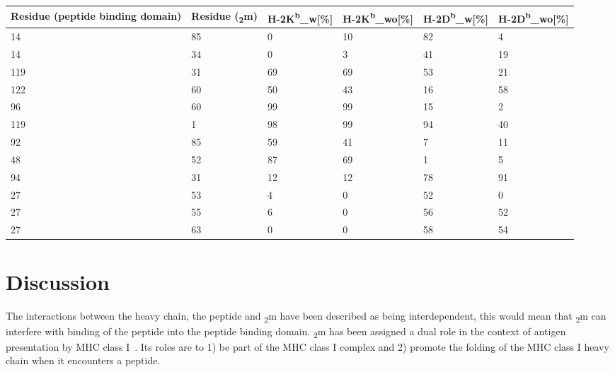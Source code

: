 \documentclass[11pt,twocolumn]{article}
\newcommand{\db}{H-2D\textsuperscript{b}\xspace}
\newcommand{\dbw}{H-2D\textsuperscript{b}\_w\xspace}
\newcommand{\dbwo}{H-2D\textsuperscript{b}\_wo\xspace}
\newcommand{\kb}{H-2K\textsuperscript{b}\xspace}
\newcommand{\kbw}{H-2K\textsuperscript{b}\_w\xspace}
\newcommand{\kbwo}{H-2K\textsuperscript{b}\_wo\xspace}
\newcommand{\angstr}{{\AA}ngstroms\xspace}
\newcommand{\btm}{\textbeta\textsubscript{2}m\xspace}
\begin{document}
\begin{table*}
\caption{\textbf{ Compilation of the the interacting residues used for the
	analysis of \kb and \db, and the percentage of interactions bellow
below four \angstr, of each analysed condition.} The residues interacting
coming from the peptide binding domain, the residues interacting coming from
\btm and the percentage of their interaction which is below four \angstr is
analysed in \db and \kb for the condition of with peptide and without peptide}
\label{KBDBinteractions}
\begin{tabularx}{\linewidth}{|X|X|X|X|X|X|}  \hline
Residue (peptide binding domain)&Residue (\btm)&\kbw [\%]&\kbwo [\%]&\dbw [\%]&\dbwo [\%]\\ \hline
14&85&0&10&82&4\\ \hline
14&34&0&3&41&19\\ \hline
119&31&69&69&53&21\\ \hline
122&60&50&43&16&58\\ \hline
96&60&99&99&15&2\\ \hline
119&1&98&99&94&40\\ \hline
92&85&59&41&7&11\\ \hline
48&52&87&69&1&5\\ \hline
94&31&12&12&78&91\\ \hline
27&53&4&0&52&0\\ \hline
27&55&6&0&56&52\\ \hline
27&63&0&0&58&54\\ \hline
\end{tabularx}
\end{table*}









\section*{Discussion}

The interactions between the heavy chain, the peptide and \btm have been
described  as being interdependent, this would mean that \btm can interfere
with binding of the peptide into the peptide binding domain.  \btm has been
assigned a dual role in the context of antigen presentation by MHC class
I~\cite{achour2006structural}. Its roles are to 1) be part of the MHC class I
complex and 2) promote the folding of the MHC class I heavy chain when it
encounters a peptide.
\end{document}
